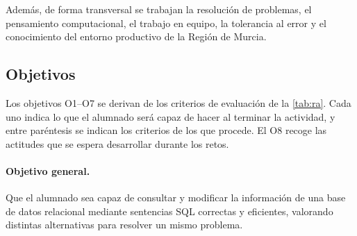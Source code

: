 \documentclass[11pt,a4paper]{article}
\begin{document}
Además, de forma transversal se trabajan la resolución de problemas, el pensamiento
computacional, el trabajo en equipo, la tolerancia al error y el conocimiento del entorno
productivo de la Región de Murcia.

\subsection{Objetivos}
\label{sec:objetivos}

Los objetivos O1--O7 se derivan de los criterios de evaluación de la \autoref{tab:ra}. Cada
uno indica lo que el alumnado será capaz de
hacer al terminar la actividad, y entre paréntesis se indican los criterios de los que procede. El O8
recoge las actitudes que se espera desarrollar durante los retos.

\paragraph{Objetivo general.} Que el alumnado sea capaz de consultar y modificar la
información de una base de datos relacional mediante sentencias SQL correctas y eficientes,
valorando distintas alternativas para resolver un mismo problema.
\end{document}

